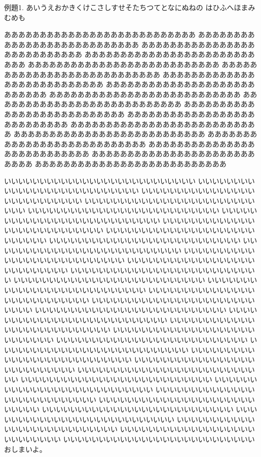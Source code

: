 \documentclass{jarticle}
\begin{document}
\begin{breakitemsquarebox}{例題1. }
あいうえおかきくけこさしすせそたちつてとなにぬねの
はひふへほまみむめも

あああああああああああああああああああああああああああ
あああああああああああああああああああああああああああ
あああああああああああああああああああああああああああ
あああああああああああああああああああああああああああ
あああああああああああああああああああああああああああ
あああああああああああああああああああああああああああ
あああああああああああああああああああああああああああ
あああああああああああああああああああああああああああ
あああああああああああああああああああああああああああ
あああああああああああああああああああああああああああ
あああああああああああああああああああああああああああ
あああああああああああああああああああああああああああ
あああああああああああああああああああああああああああ
あああああああああああああああああああああああああああ
あああああああああああああああああああああああああああ
あああああああああああああああああああああああああああ
あああああああああああああああああああああああああああ
あああああああああああああああああああああああああああ

いいいいいいいいいいいいいいいいいいいいいいいいいいい
いいいいいいいいいいいいいいいいいいいいいいいいいいい
いいいいいいいいいいいいいいいいいいいいいいいいいいい
いいいいいいいいいいいいいいいいいいいいいいいいいいい
いいいいいいいいいいいいいいいいいいいいいいいいいいい
いいいいいいいいいいいいいいいいいいいいいいいいいいい
いいいいいいいいいいいいいいいいいいいいいいいいいいい
いいいいいいいいいいいいいいいいいいいいいいいいいいい
いいいいいいいいいいいいいいいいいいいいいいいいいいい
いいいいいいいいいいいいいいいいいいいいいいいいいいい
いいいいいいいいいいいいいいいいいいいいいいいいいいい
いいいいいいいいいいいいいいいいいいいいいいいいいいい
いいいいいいいいいいいいいいいいいいいいいいいいいいい
いいいいいいいいいいいいいいいいいいいいいいいいいいい
いいいいいいいいいいいいいいいいいいいいいいいいいいい
いいいいいいいいいいいいいいいいいいいいいいいいいいい
いいいいいいいいいいいいいいいいいいいいいいいいいいい
いいいいいいいいいいいいいいいいいいいいいいいいいいい
いいいいいいいいいいいいいいいいいいいいいいいいいいい
いいいいいいいいいいいいいいいいいいいいいいいいいいい
いいいいいいいいいいいいいいいいいいいいいいいいいいい
いいいいいいいいいいいいいいいいいいいいいいいいいいい
いいいいいいいいいいいいいいいいいいいいいいいいいいい
いいいいいいいいいいいいいいいいいいいいいいいいいいい
いいいいいいいいいいいいいいいいいいいいいいいいいいい
いいいいいいいいいいいいいいいいいいいいいいいいいいい
いいいいいいいいいいいいいいいいいいいいいいいいいいい
いいいいいいいいいいいいいいいいいいいいいいいいいいい
いいいいいいいいいいいいいいいいいいいいいいいいいいい
いいいいいいいいいいいいいいいいいいいいいいいいいいい
いいいいいいいいいいいいいいいいいいいいいいいいいいい
いいいいいいいいいいいいいいいいいいいいいいいいいいい
いいいいいいいいいいいいいいいいいいいいいいいいいいい
いいいいいいいいいいいいいいいいいいいいいいいいいいい
いいいいいいいいいいいいいいいいいいいいいいいいいいい
おしまいよ。
\end{breakitemsquarebox}
\end{document}
